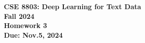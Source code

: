 \documentclass[11pt]{article}
\begin{document}

\begin{center}
\LARGE
 \LARGE \textbf{CSE 8803: Deep Learning for Text Data \\Fall 2024}
\\
\textbf{Homework 3}
\\[1ex]
\Large \textbf{Due: Nov.5, 2024}
\end{center}



\medskip
\begin{problems}






\clearpage




\clearpage




\end{problems}

\clearpage



\end{document}
